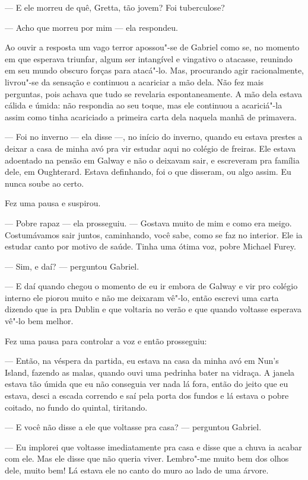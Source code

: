 --- E ele morreu de quê, Gretta, tão jovem?  Foi tuberculose?

--- Acho que morreu por mim --- ela respondeu.

Ao ouvir a resposta um vago terror apossou"-se de Gabriel como se, no momento em
que esperava triunfar, algum ser intangível e vingativo o atacasse, reunindo em
seu mundo obscuro forças para atacá"-lo.  Mas, procurando agir racionalmente,
livrou"-se da sensação e continuou a acariciar a mão dela.  Não fez mais
perguntas, pois achava que tudo se revelaria espontaneamente.  A mão dela
estava cálida e úmida: não respondia ao seu toque, mas ele continuou a
acariciá"-la assim como tinha acariciado a primeira carta dela naquela manhã de
primavera.

--- Foi no inverno --- ela disse ---, no início do inverno, quando eu estava
prestes a deixar a casa de minha avó pra vir estudar aqui no colégio de
freiras.  Ele estava adoentado na pensão em Galway e não o deixavam sair, e
escreveram pra  família dele, em Oughterard.  Estava definhando, foi o que
disseram, ou algo assim.  Eu nunca soube ao certo.

Fez uma pausa e suspirou.

--- Pobre rapaz --- ela prosseguiu.  --- Gostava muito de mim e como era meigo.
Costumávamos sair juntos, caminhando, você sabe, como se faz no interior.  Ele
ia estudar canto por motivo de saúde.  Tinha uma ótima voz, pobre Michael
Furey.

--- Sim, e daí? --- perguntou Gabriel.

--- E daí quando chegou o momento de eu ir embora de Galway e vir pro colégio
interno ele piorou muito e não me deixaram vê"-lo, então escrevi uma carta
dizendo que ia pra Dublin e que voltaria no verão e que quando voltasse
esperava vê"-lo bem melhor.

Fez uma pausa para controlar a voz e então prosseguiu:

--- Então, na véspera da partida, eu estava na casa da minha avó em Nun’s
Island, fazendo as malas, quando ouvi uma pedrinha bater na vidraça.  A janela
estava tão úmida que eu não conseguia ver nada lá fora, então do jeito que eu
estava, desci a escada correndo e saí pela porta dos fundos e lá estava o pobre
coitado, no fundo do quintal, tiritando.

--- E você não disse a ele que voltasse pra casa? --- perguntou Gabriel.

--- Eu implorei que voltasse imediatamente pra casa e disse que a chuva ia
acabar com ele.  Mas ele disse que não queria viver.  Lembro"-me muito bem dos
olhos dele, muito bem!  Lá estava ele no canto do muro ao lado de uma árvore.


